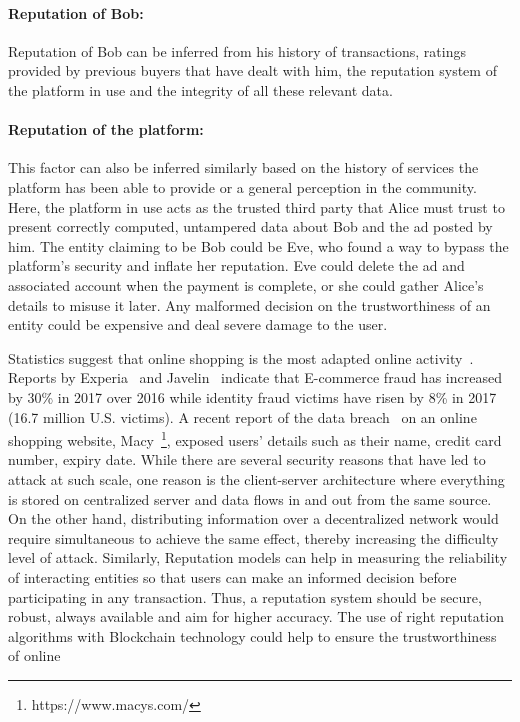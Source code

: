 \paragraph{Reputation of Bob:} Reputation of Bob can be inferred from his
history of transactions, ratings provided by previous buyers that have dealt
with him, the reputation system of the platform in use and the integrity of all
these relevant data.  
\paragraph{Reputation of the platform:} This factor can also be inferred similarly based on the history of services the platform has been able to provide or a general perception in the community. Here, the platform in use acts as the trusted third party that Alice must trust to present correctly computed, untampered data about Bob and the ad posted by him. The entity claiming to be Bob could be Eve, who found a way to bypass the platform's security and inflate her reputation. Eve could delete the ad and associated account when the payment is complete, or she could gather Alice's details to misuse it later.  Any malformed decision on the trustworthiness of an entity could be expensive and deal severe damage to the user. \par
Statistics suggest that online shopping is the most adapted online
activity~\cite{experian}. Reports by Experia~\cite{experian} and
Javelin~\cite{javelin} indicate that E-commerce fraud has increased by 30\% in
2017 over 2016 while identity fraud victims have risen by 8\% in 2017 (16.7
million U.S. victims). A recent report of the data breach~\cite{macy} on an
online shopping website, Macy~\footnote{https://www.macys.com/}, exposed users’
details such as their name, credit card number, expiry date. While there are
several security reasons that have led to attack at such scale, one reason is
the client-server architecture where everything is stored on centralized server
and data flows in and out from the same source. On the other hand, distributing
information over a decentralized network would require simultaneous to achieve
the same effect, thereby increasing the difficulty level of attack. Similarly,
Reputation models can help in measuring the reliability of interacting entities
so that users can make an informed decision before participating in any
transaction. Thus, a reputation system should be secure, robust, always
available and aim for higher accuracy. The use of right reputation algorithms
with Blockchain technology could help to ensure the trustworthiness of online
